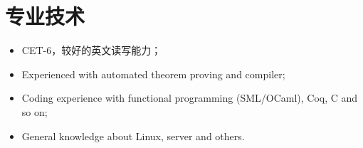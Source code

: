 \documentclass[margin]{res}
\begin{document}
\section{专业技术}
\begin{itemize}
    \item CET-6，较好的英文读写能力；
    \item Experienced with automated theorem proving and compiler;
    \item Coding experience with functional programming (SML/OCaml), Coq, C and so on;
    \item General knowledge about Linux, server and others.
\end{itemize}


\end{document}
